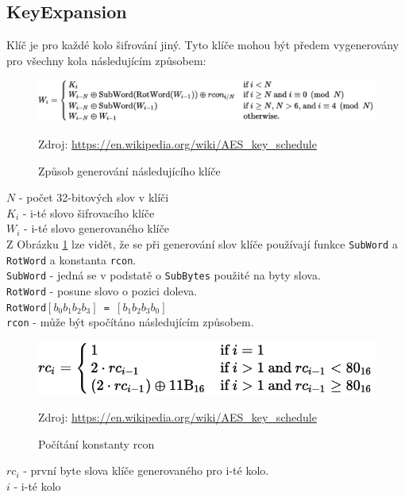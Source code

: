 \documentclass[12pt]{article}
\begin{document}
\subsection{KeyExpansion}
Klíč je pro každé kolo šifrování jiný. Tyto klíče mohou být předem vygenerovány
pro všechny kola následujícím způsobem:
\begin{figure} [ht]
	\centering
	\includegraphics[width=\textwidth]{img/key_expansion_schedule.pdf}
	\caption{Způsob generování následujícího klíče}
	Zdroj: \url{https://en.wikipedia.org/wiki/AES\_key\_schedule}
	\label{fig:key_exp_schedule}
\end{figure}

\noindent\texttt{\textbf{$N$}} - počet 32-bitových slov v klíči\\
\texttt{\textbf{$K_{i}$}} - i-té slovo šifrovacího klíče\\
\texttt{\textbf{$W_{i}$}} - i-té slovo generovaného klíče\\

Z Obrázku \ref{fig:key_exp_schedule} lze vidět, že se při generování slov klíče
používají funkce \texttt{SubWord} a \texttt{RotWord} a konstanta \texttt{rcon}.\\

\noindent\texttt{SubWord} - jedná se v podstatě o \texttt{SubBytes} použité na
			byty slova.\\
\texttt{RotWord} - posune slovo o pozici doleva.\\
\indent\texttt{RotWord$[b_0 b_1 b_2 b_3]$ = $[b_1 b_2 b_3 b_0]$}\\
\texttt{rcon} - může být spočítáno následujícím způsobem.\\
\begin{figure} [ht]
	\centering
	\includegraphics[width=\textwidth]{img/key_expansion_rc.pdf}
	\caption{Počítání konstanty rcon}
	Zdroj: \url{https://en.wikipedia.org/wiki/AES\_key\_schedule}
	\label{fig:key_exp_rc}
\end{figure}

\noindent\texttt{\textbf{$rc_i$}} - první byte slova klíče generovaného pro
					i-té kolo.\\
\texttt{\textbf{$i$}} - i-té kolo\\
\pagebreak
%
\end{document}
